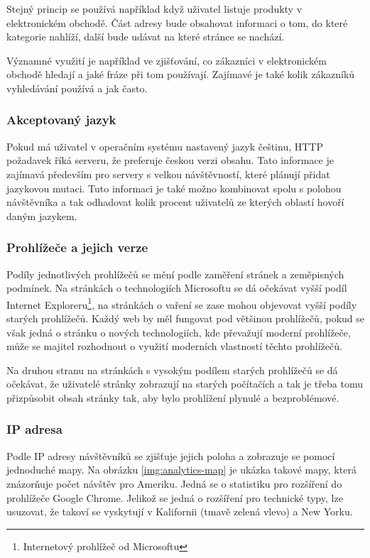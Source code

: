 \documentclass[bc,male,java,dept456]{diploma}						%
\begin{document}
\bigskip

Stejný princip se používá například když uživatel listuje produkty v elektronickém obchodě. Část adresy bude obsahovat informaci o tom, do které kategorie nahlíží, další bude udávat na které stránce se nachází.

Významné využití je například ve zjišťování, co zákazníci v elektronickém obchodě hledají a jaké fráze při tom používají. Zajímavé je také kolik zákazníků vyhledávání používá a jak často.

\subsubsection{Akceptovaný jazyk}

Pokud má uživatel v operačním systému nastavený jazyk češtinu, HTTP požadavek říká serveru, že preferuje českou verzi obsahu. Tato informace je zajímavá především pro servery s velkou návštěvností, které plánují přidat jazykovou mutaci. Tuto informaci je také možno kombinovat spolu s polohou návštěvníka a tak odhadovat kolik procent uživatelů ze kterých oblastí hovoří daným jazykem.


\subsubsection{Prohlížeče a jejich verze}

Podíly jednotlivých prohlížečů se mění podle zaměření stránek a zeměpisných podmínek. Na stránkách o technologiích Microsoftu se dá očekávat vyšší podíl Internet Exploreru\footnote{Internetový prohlížeč od Microsoftu}, na stránkách o vaření se zase mohou objevovat vyšší podíly starých prohlížečů. Každý web by měl fungovat pod většinou prohlížečů, pokud se však jedná o stránku o nových technologiích, kde převažují moderní prohlížeče, může se majitel rozhodnout o využití moderních vlastností těchto prohlížečů.

Na druhou stranu na stránkách s vysokým podílem starých prohlížečů se dá očekávat, že uživatelé stránky zobrazují na starých počítačích a tak je třeba tomu přizpůsobit obsah stránky tak, aby bylo prohlížení plynulé a bezproblémové.

\subsubsection{IP adresa}

Podle IP adresy návštěvníků se zjišťuje jejich poloha a zobrazuje se pomocí jednoduché mapy. Na obrázku \ref{img:analytics-map} je ukázka takové mapy, která znázorňuje počet návštěv pro Ameriku. Jedná se o statistiku pro roz\-ší\-ře\-ní do prohlížeče Google Chrome. Jelikož se jedná o roz\-ší\-ře\-ní pro technické typy, lze usuzovat, že takoví se vyskytují v Kalifornii (tmavě zelená vlevo) a New Yorku.
\end{document}
